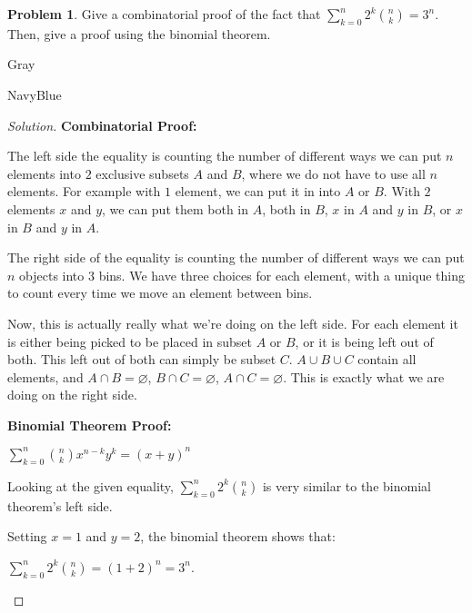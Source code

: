 \documentclass[12pt]{amsart}
\newcounter{problem_number}[section]
\theoremstyle{named}
\newenvironment{soln}
{\begin{color}{Gray}\begin{framed}\begin{color}{NavyBlue}\begin{proof}[Solution]
\doublespacing}
{\end{proof}\end{color}\end{framed}\end{color}}
\theoremstyle{definition}
\newtheorem{problem}{Problem}
\begin{document}
\begin{problem}
	Give a combinatorial proof of the fact that $\displaystyle \sum_{k=0}^n2^k{n\choose k} = 3^n$.
	Then, give a proof using the binomial theorem.
\end{problem}

\begin{soln}
    \phantom{ }

    \textbf{Combinatorial Proof:}

    \begin{adjustwidth}{2em}{0em}
        \noindent The left side the equality is counting the number of different ways we can 
        put $n$ elements into $2$ exclusive subsets $A$ and $B$, where we do not have to use all $n$ elements.
        For example with $1$ element, we can put it in into $A$ or $B$. With $2$ elements $x$ and $y$,
        we can put them both in $A$, both in $B$, $x$ in $A$ and $y$ in $B$, or $x$ in $B$ and $y$ in $A$.

        \phantom{ }

        \noindent The right side of the equality is counting
        the number of different ways we can put $n$ objects into $3$ bins. We have three choices
        for each element, with a unique thing to count every time we move an element between bins.

        \phantom{ }

        \noindent Now, this is actually really what we're doing on the left side. For each element
        it is either being picked to be placed in subset $A$ or $B$, or it is being left out of both.
        This left out of both can simply be subset $C$. $A \cup B \cup C$ contain all elements, and
        $A \cap B = \varnothing$, $B \cap C = \varnothing$, $A \cap C = \varnothing$. This is
        exactly what we are doing on the right side. 
    \end{adjustwidth}

    \phantom{ }

    \textbf{Binomial Theorem Proof:}

    \begin{adjustwidth}{2em}{0em}
        $\displaystyle\sum_{k = 0}^{n} {n \choose k} x^{n-k}y^k = (x + y)^n$

        \phantom{ }

        \noindent Looking at the given equality, $\displaystyle \sum_{k=0}^n2^k{n\choose k}$ is
        very similar to the binomial theorem's left side. 
        
        \noindent Setting $x = 1$ and $y = 2$, the binomial theorem shows that:

        \noindent $\displaystyle\sum_{k = 0}^{n} 2^k {n \choose k} = (1 + 2)^n = 3^n$.
    \end{adjustwidth}

\end{soln}

\end{document}
